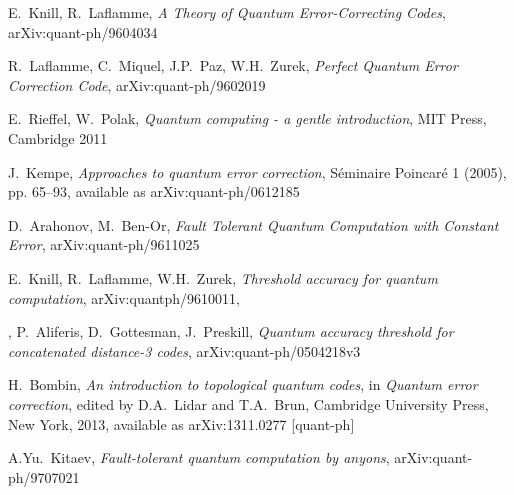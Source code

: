 \documentclass[a4paper, draft]{article}
\theoremstyle{own}
\theoremstyle{remark}
\begin{document}
\begin{thebibliography}{9}
E.~Knill, R.~Laflamme, \emph{A Theory of Quantum Error-Correcting Codes}, arXiv:quant-ph/9604034

R.~Laflamme, C.~Miquel, J.P.~Paz, W.H.~Zurek, \emph{Perfect Quantum Error Correction Code}, 	arXiv:quant-ph/9602019	
	

E.~Rieffel, W.~Polak, \emph{Quantum computing - a gentle introduction},
MIT Press, Cambridge 2011

J.~Kempe, \emph{Approaches to quantum error correction}, S\'eminaire Poincar\'e 1 (2005), pp. 65--93, available as arXiv:quant-ph/0612185

D.~Arahonov, M.~Ben-Or, \emph{Fault Tolerant Quantum Computation with Constant Error},
arXiv:quant-ph/9611025

E.~Knill, R.~Laflamme, W.H.~Zurek, \emph{Threshold accuracy for quantum computation}, arXiv:quantph/9610011,

,
P.~Aliferis, D.~Gottesman, J.~Preskill, \emph{Quantum accuracy threshold for concatenated distance-3 codes}, arXiv:quant-ph/0504218v3

H.~Bombin, 
\emph{An introduction to topological quantum codes}, in \emph{Quantum error correction}, edited by D.A.~Lidar and T.A.~Brun, Cambridge University Press, New York, 2013, available as arXiv:1311.0277 [quant-ph]

A.Yu.~Kitaev, \emph{Fault-tolerant quantum computation by anyons}, 
arXiv:quant-ph/9707021

\end{thebibliography}
\end{document}
